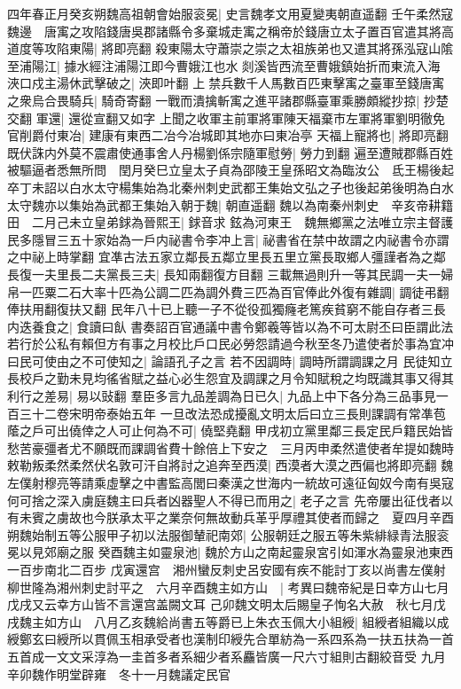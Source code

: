 四年春正月癸亥朔魏高祖朝會始服衮冕|{
	史言魏孝文用夏變夷朝直遥翻}
壬午柔然寇魏邊　唐㝢之攻陷錢唐吳郡諸縣令多棄城走㝢之稱帝於錢唐立太子置百官遣其將高道度等攻陷東陽|{
	將即亮翻}
殺東陽太守蕭崇之崇之太祖族弟也又遣其將孫泓寇山隂至浦陽江|{
	據水經注浦陽江即今曹娥江也水剡溪皆西流至曹娥鎮始折而東流入海}
浹口戍主湯休武擊破之|{
	浹即叶翻}
上禁兵數千人馬數百匹東擊㝢之臺軍至錢唐㝢之衆烏合畏騎兵|{
	騎奇寄翻}
一戰而潰擒斬㝢之進平諸郡縣臺軍乘勝頗縱抄掠|{
	抄楚交翻}
軍還|{
	還從宣翻又如字}
上聞之收軍主前軍將軍陳天福棄市左軍將軍劉明徹免官削爵付東冶|{
	建康有東西二冶今冶城即其地亦曰東冶亭}
天福上寵將也|{
	將即亮翻}
既伏誅内外莫不震肅使通事舍人丹楊劉係宗隨軍慰勞|{
	勞力到翻}
遍至遭賊郡縣百姓被驅逼者悉無所問　閏月癸巳立皇太子貞為邵陵王皇孫昭文為臨汝公　氐王楊後起卒丁未詔以白水太守楊集始為北秦州刺史武都王集始文弘之子也後起弟後明為白水太守魏亦以集始為武都王集始入朝于魏|{
	朝直遥翻}
魏以為南秦州刺史　辛亥帝耕籍田　二月己未立皇弟銶為晉熙王|{
	銶音求}
鉉為河東王　魏無鄉黨之法唯立宗主督護民多隱冒三五十家始為一戶内祕書令李冲上言|{
	祕書省在禁中故謂之内祕書令亦謂之中祕上時掌翻}
宜凖古法五家立鄰長五鄰立里長五里立黨長取鄉人彊謹者為之鄰長復一夫里長二夫黨長三夫|{
	長知兩翻復方目翻}
三載無過則升一等其民調一夫一婦帛一匹粟二石大率十匹為公調二匹為調外費三匹為百官俸此外復有雜調|{
	調徒弔翻俸扶用翻復扶又翻}
民年八十已上聽一子不從役孤獨癃老篤疾貧窮不能自存者三長内迭養食之|{
	食讀曰飤}
書奏詔百官通議中書令鄭羲等皆以為不可太尉丕曰臣謂此法若行於公私有賴但方有事之月校比戶口民必勞怨請過今秋至冬乃遣使者於事為宜冲曰民可使由之不可使知之|{
	論語孔子之言}
若不因調時|{
	調時所謂調課之月}
民徒知立長校戶之勤未見均徭省賦之益心必生怨宜及調課之月令知賦稅之均既識其事又得其利行之差易|{
	易以䜴翻}
羣臣多言九品差調為日已久|{
	九品上中下各分為三品事見一百三十二卷宋明帝泰始五年}
一旦改法恐成擾亂文明太后曰立三長則課調有常凖苞䕃之戶可出僥倖之人可止何為不可|{
	僥堅堯翻}
甲戌初立黨里鄰三長定民戶籍民始皆愁苦豪彊者尤不願既而課調省費十餘倍上下安之　三月丙申柔然遣使者牟提如魏時敕勒叛柔然柔然伏名敦可汗自將討之追奔至西漠|{
	西漠者大漠之西偏也將即亮翻}
魏左僕射穆亮等請乘虛擊之中書監高閭曰秦漢之世海内一統故可遠征匈奴今南有吳寇何可捨之深入虜庭魏主曰兵者凶器聖人不得已而用之|{
	老子之言}
先帝屢出征伐者以有未賓之虜故也今朕承太平之業奈何無故動兵革乎厚禮其使者而歸之　夏四月辛酉朔魏始制五等公服甲子初以法服御輦祀南郊|{
	公服朝廷之服五等朱紫緋緑青法服衮冕以見郊廟之服}
癸酉魏主如靈泉池|{
	魏於方山之南起靈泉宮引如渾水為靈泉池東西一百步南北二百步}
戊寅還宫　湘州蠻反刺史呂安國有疾不能討丁亥以尚書左僕射柳世隆為湘州刺史討平之　六月辛酉魏主如方山　|{
	考異曰魏帝紀是日幸方山七月戊戌又云幸方山皆不言還宫盖闕文耳}
己卯魏文明太后賜皇子恂名大赦　秋七月戊戌魏主如方山　八月乙亥魏給尚書五等爵已上朱衣玉佩大小組綬|{
	組綬者組織以成綬鄭玄曰綬所以貫佩玉相承受者也漢制印綬先合單紡為一系四系為一扶五扶為一首五首成一文文采淳為一圭首多者系細少者系麤皆廣一尺六寸組則古翻絞音受}
九月辛卯魏作明堂辟雍　冬十一月魏議定民官

